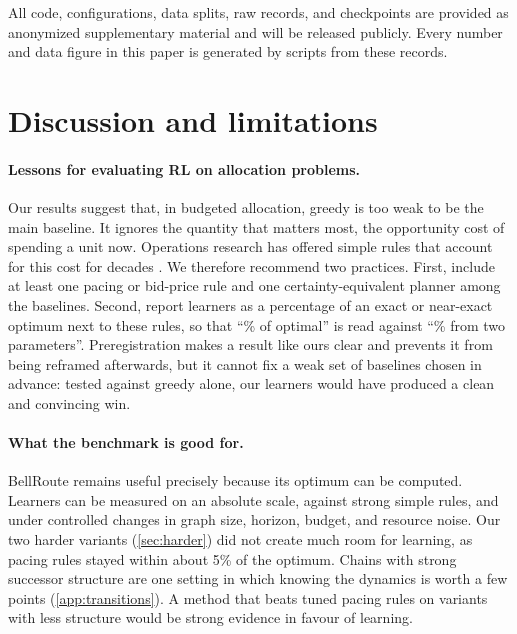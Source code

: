 \documentclass[10pt]{article}
\newcommand{\bellroute}{BellRoute}
\begin{document}
All code, configurations, data splits, raw records, and checkpoints are provided as anonymized supplementary material and will be released publicly. Every number and data figure in this paper is generated by scripts from these records.

\section{Discussion and limitations}\label{sec:discussion}

\paragraph{Lessons for evaluating RL on allocation problems.} Our results suggest that, in budgeted allocation, greedy is too weak to be the main baseline. It ignores the quantity that matters most, the opportunity cost of spending a unit now. Operations research has offered simple rules that account for this cost for decades \citep{gallego1994optimal,talluri2004theory}. We therefore recommend two practices. First, include at least one pacing or bid-price rule and one certainty-equivalent planner among the baselines. Second, report learners as a percentage of an exact or near-exact optimum next to these rules, so that ``\cfFracPpo\% of optimal'' is read against ``\cfFracBp\% from two parameters''. Preregistration makes a result like ours clear and prevents it from being reframed afterwards, but it cannot fix a weak set of baselines chosen in advance: tested against greedy alone, our learners would have produced a clean and convincing win.

\paragraph{What the benchmark is good for.} \bellroute{} remains useful precisely because its optimum can be computed. Learners can be measured on an absolute scale, against strong simple rules, and under controlled changes in graph size, horizon, budget, and resource noise. Our two harder variants (\cref{sec:harder}) did not create much room for learning, as pacing rules stayed within about 5\% of the optimum. Chains with strong successor structure are one setting in which knowing the dynamics is worth a few points (\cref{app:transitions}). A method that beats tuned pacing rules on variants with less structure would be strong evidence in favour of learning.
\end{document}
